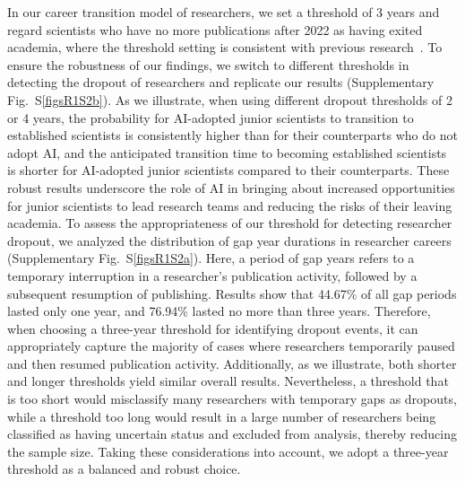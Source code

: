 In our career transition model of researchers, we set a threshold of 3 years and regard scientists who have no more publications after 2022 as having exited academia, where the threshold setting is consistent with previous research~\supercite{milojevic2018changing}.
To ensure the robustness of our findings, we switch to different thresholds in detecting the dropout of researchers and replicate our results (Supplementary Fig.~S\ref{figsR1S2b}).
As we illustrate, when using different dropout thresholds of 2 or 4 years, the probability for AI-adopted junior scientists to transition to established scientists is consistently higher than for their counterparts who do not adopt AI, and the anticipated transition time to becoming established scientists is shorter for AI-adopted junior scientists compared to their counterparts.
These robust results underscore the role of AI in bringing about increased opportunities for junior scientists to lead research teams and reducing the risks of their leaving academia.
To assess the appropriateness of our threshold for detecting researcher dropout, we analyzed the distribution of gap year durations in researcher careers (Supplementary Fig.~S\ref{figsR1S2a}).
Here, a period of gap years refers to a temporary interruption in a researcher’s publication activity, followed by a subsequent resumption of publishing. Results show that 44.67\% of all gap periods lasted only one year, and 76.94\% lasted no more than three years.
Therefore, when choosing a three-year threshold for identifying dropout events, it can appropriately capture the majority of cases where researchers temporarily paused and then resumed publication activity.
Additionally, as we illustrate, both shorter and longer thresholds yield similar overall results.
Nevertheless, a threshold that is too short would misclassify many researchers with temporary gaps as dropouts, while a threshold too long would result in a large number of researchers being classified as having uncertain status and excluded from analysis, thereby reducing the sample size.
Taking these considerations into account, we adopt a three-year threshold as a balanced and robust choice.

